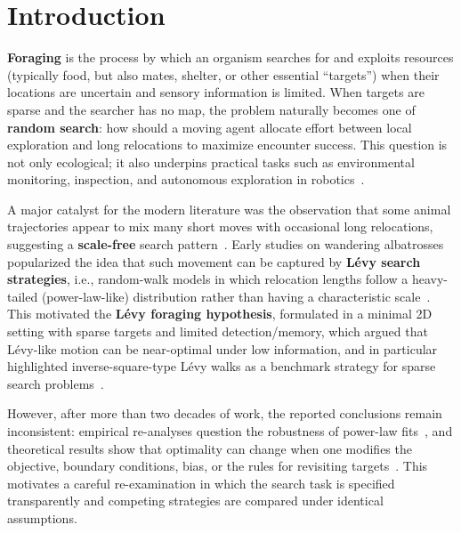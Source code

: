\chapter{Introduction}
\label{ch:introduction}

\textbf{Foraging} is the process by which an organism searches for and exploits resources (typically food, but also mates, shelter, or other essential “targets”) when their locations are uncertain and sensory information is limited. When targets are sparse and the searcher has no map, the problem naturally becomes one of \textbf{random search}: how should a moving agent allocate effort between local exploration and long relocations to maximize encounter success. This question is not only ecological; it also underpins practical tasks such as environmental monitoring, inspection, and autonomous exploration in robotics~\cite{benichou2011intermittent}.

A major catalyst for the modern literature was the observation that some animal trajectories appear to mix many short moves with occasional long relocations, suggesting a \textbf{scale-free} search pattern~\cite{viswanathan1996albatross}. Early studies on wandering albatrosses popularized the idea that such movement can be captured by \textbf{Lévy search strategies}, i.e., random-walk models in which relocation lengths follow a heavy-tailed (power-law-like) distribution rather than having a characteristic scale~\cite{viswanathan1996albatross,shlesinger1986walks,shlesinger1993strange}. This motivated the \textbf{Lévy foraging hypothesis}, formulated in a minimal 2D setting with sparse targets and limited detection/memory, which argued that Lévy-like motion can be near-optimal under low information, and in particular highlighted inverse-square-type Lévy walks as a benchmark strategy for sparse search problems~\cite{viswanathan1999optimizing}. 

However, after more than two decades of work, the reported conclusions remain inconsistent: empirical re-analyses question the robustness of power-law fits~\cite{edwards2007revisiting,james2011assessing,plank2008optimal}, and theoretical results show that optimality can change when one modifies the objective, boundary conditions, bias, or the rules for revisiting targets~\cite{buldyrev2021comment,levernier2020inverse,palyulin2014levy,volpe2017topography}. This motivates a careful re-examination in which the search task is specified transparently and competing strategies are compared under identical assumptions.


